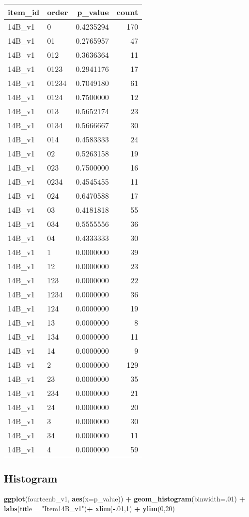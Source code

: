 \documentclass[]{book}
\newenvironment{Shaded}{\begin{snugshade}}{\end{snugshade}}
\newcommand{\KeywordTok}[1]{\textcolor[rgb]{0.13,0.29,0.53}{\textbf{#1}}}
\newcommand{\DataTypeTok}[1]{\textcolor[rgb]{0.13,0.29,0.53}{#1}}
\newcommand{\DecValTok}[1]{\textcolor[rgb]{0.00,0.00,0.81}{#1}}
\newcommand{\StringTok}[1]{\textcolor[rgb]{0.31,0.60,0.02}{#1}}
\newcommand{\OperatorTok}[1]{\textcolor[rgb]{0.81,0.36,0.00}{\textbf{#1}}}
\newcommand{\NormalTok}[1]{#1}
\theoremstyle{definition}
\theoremstyle{definition}
\theoremstyle{definition}
\theoremstyle{remark}
\begin{document}
\begin{longtable}[]{@{}llrr@{}}
\toprule
item\_id & order & p\_value & count\tabularnewline
\midrule
\endhead
14B\_v1 & 0 & 0.4235294 & 170\tabularnewline
14B\_v1 & 01 & 0.2765957 & 47\tabularnewline
14B\_v1 & 012 & 0.3636364 & 11\tabularnewline
14B\_v1 & 0123 & 0.2941176 & 17\tabularnewline
14B\_v1 & 01234 & 0.7049180 & 61\tabularnewline
14B\_v1 & 0124 & 0.7500000 & 12\tabularnewline
14B\_v1 & 013 & 0.5652174 & 23\tabularnewline
14B\_v1 & 0134 & 0.5666667 & 30\tabularnewline
14B\_v1 & 014 & 0.4583333 & 24\tabularnewline
14B\_v1 & 02 & 0.5263158 & 19\tabularnewline
14B\_v1 & 023 & 0.7500000 & 16\tabularnewline
14B\_v1 & 0234 & 0.4545455 & 11\tabularnewline
14B\_v1 & 024 & 0.6470588 & 17\tabularnewline
14B\_v1 & 03 & 0.4181818 & 55\tabularnewline
14B\_v1 & 034 & 0.5555556 & 36\tabularnewline
14B\_v1 & 04 & 0.4333333 & 30\tabularnewline
14B\_v1 & 1 & 0.0000000 & 39\tabularnewline
14B\_v1 & 12 & 0.0000000 & 23\tabularnewline
14B\_v1 & 123 & 0.0000000 & 22\tabularnewline
14B\_v1 & 1234 & 0.0000000 & 36\tabularnewline
14B\_v1 & 124 & 0.0000000 & 19\tabularnewline
14B\_v1 & 13 & 0.0000000 & 8\tabularnewline
14B\_v1 & 134 & 0.0000000 & 11\tabularnewline
14B\_v1 & 14 & 0.0000000 & 9\tabularnewline
14B\_v1 & 2 & 0.0000000 & 129\tabularnewline
14B\_v1 & 23 & 0.0000000 & 35\tabularnewline
14B\_v1 & 234 & 0.0000000 & 21\tabularnewline
14B\_v1 & 24 & 0.0000000 & 20\tabularnewline
14B\_v1 & 3 & 0.0000000 & 30\tabularnewline
14B\_v1 & 34 & 0.0000000 & 11\tabularnewline
14B\_v1 & 4 & 0.0000000 & 59\tabularnewline
\bottomrule
\end{longtable}

\subsection{Histogram}\label{histogram-2}

\begin{Shaded}
\begin{Highlighting}[]
\KeywordTok{ggplot}\NormalTok{(fourteenb_v1, }\KeywordTok{aes}\NormalTok{(}\DataTypeTok{x=}\NormalTok{p_value)) }\OperatorTok{+}\StringTok{ }\KeywordTok{geom_histogram}\NormalTok{(}\DataTypeTok{binwidth=}\NormalTok{.}\DecValTok{01}\NormalTok{) }\OperatorTok{+}\StringTok{ }\KeywordTok{labs}\NormalTok{(}\DataTypeTok{title =} \StringTok{"Item14B_v1"}\NormalTok{)}\OperatorTok{+}\StringTok{ }\KeywordTok{xlim}\NormalTok{(}\OperatorTok{-}\NormalTok{.}\DecValTok{01}\NormalTok{,}\DecValTok{1}\NormalTok{) }\OperatorTok{+}\StringTok{ }\KeywordTok{ylim}\NormalTok{(}\DecValTok{0}\NormalTok{,}\DecValTok{20}\NormalTok{)}
\end{Highlighting}
\end{Shaded}
\end{document}
